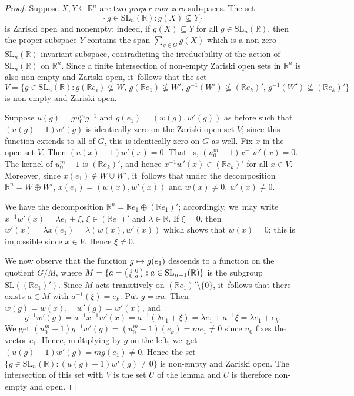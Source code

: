 \documentclass[JEP,XML,SOM,Unicode,published]{cedram}
\newenvironment{smallpmatrix}{\big(\begin{smallmatrix}}{\end{smallmatrix}\big)}
\def\mto{\mathchoice{\longmapsto}{\mapsto}{\mapsto}{\mapsto}}
\theoremstyle{definition}
\newcommand{\field}[1]{\mathbb{#1}}
\newcommand{\R}{\field{R}}
\newcommand{\SL}{\mathrm{SL}}
\let\l\lambda
\begin{document}
\begin{proof}
Suppose $X,Y \subseteq \R ^n$ are two \emph{proper non-zero} subspaces. The set\vspace*{-3pt}
\[
\{g\in \SL_n(\R): g(X) \not \subseteq Y\}
\]
is Zariski open and nonempty: indeed, if $g(X)\subseteq Y$ for all $g\in \SL_n(\R)$, then the proper subspace $Y$ contains the span $\sum_{g\in G} g(X)$ which is a non-zero $\SL_n(\R)$-invariant subspace, contradicting the irreducibility of the action of $\SL_n(\R)$ on $\R^n$. Since a finite intersection of non-empty Zariski open sets in $\R^n$ is also non-empty and Zariski open, it~follows that the set\vspace*{-3pt}
\[
V =\bigl\{g\in \SL_n(\R): g(\R e_i) \!\not \subseteq\! W,\, g(\R e_1)\!\not \subseteq\! W',\,g^{-1}(W')\!\not \subseteq\! (\R e_k)',\, g^{-1}(W') \!\not \subseteq\! (\R e_k)' \bigr\}
\]
is non-empty and Zariski open.

Suppose $u(g)\!=\!gu_0^mg^{-1}$ and $g(e_1)\!=\!(w(g),w'(g))$ as before such that \hbox{$(u(g)\!-\!1)w'(g)$} is identically zero on the Zariski open set $V$; since this function extends to all of $G$, this is identically zero on $G$ as well. Fix $x$ in the open set $V$. Then $(u(x)-1)w'(x)=0$. That~is, $(u_0^m-1)x^{-1}w'(x)=0$. The kernel of $u_0^m-1$ is $(\R e_k)'$, and hence $x^{-1}w'(x) \in (\R e_k)'$ for all $x\in V$. Moreover, since $x(e_1)\notin W\cup W'$, it~follows that under the decomposition $\R ^n=W\oplus W'$, $x(e_1)=(w(x),w'(x))$ and $w(x)\neq 0$, $w'(x)\neq 0$.

We have the decomposition $\R ^n= \R e_1\oplus (\R e_1)'$; accordingly, we~may write $x^{-1}w'(x)=\l e_1+\xi$, $\xi \in (\R e_1)'$ and $\l \in \R$. If $\xi=0$, then $w'(x)=\l x(e_1) = \l (w(x), w'(x))$ which shows that $w(x)=0$; this is impossible since $x\in V$. Hence $\xi \neq 0$.

We now observe that the function $g\mto g(e_1)$ descends to a function on the quotient $G/M$, where $M=\{ a= \begin{smallpmatrix} 1 & 0 \\ 0 & a \end{smallpmatrix}: a \in \SL_{n-1}(\R)\}$ is the subgroup $\SL((\R e_1)')$. Since $M$ acts transitively on $(\R e_1)' \setminus \{0\}$, it~follows that there exists $a\in M$ with $a^{-1}(\xi)=e_k$. Put $g=xa$. Then $w(g)=w(x), \quad w'(g)=w'(x)$, and\vspace*{-3pt}\enlargethispage{.5\baselineskip}
\[
g^{-1}w'(g)= a^{-1}x^{-1}w'(x)=a^{-1}(\l e_1+ \xi)=\l e_1+a^{-1}\xi=\l e_1+e_k.
\]
We get $(u_0^m-1)g^{-1}w'(g)= (u_0^m-1)(e_k)=me_1\neq 0$ since $u_0$ fixes the vector $e_1$. Hence, multiplying by $g$ on the left, we~get $(u(g)-1)w'(g) =mg(e_1) \neq 0$. Hence the set $\{ g\in \SL_n(\R): (u(g)-1)w'(g)\neq 0\}$ is non-empty and Zariski open. The intersection of this set with $V$ is the set $U$ of the lemma and $U$ is therefore non-empty and open.
\end{proof}
\end{document}
